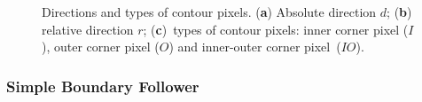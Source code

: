 \documentclass[sensors,article,accept,moreauthors,pdftex,10pt,a4paper]{mdpi}
\begin{document}
\begin{figure}[H]
	\centering
	 
	\caption{Directions and types of contour pixels. (\textbf{a}) Absolute direction $d$; (\textbf{b}) relative direction $r$; (\textbf{c})~types of contour pixels: inner corner pixel ($I$), outer corner pixel ($O$) and inner-outer corner pixel~($IO$).}
	\label{fig:image2}
\end{figure}


\subsubsection{Simple Boundary Follower}

\end{document}
